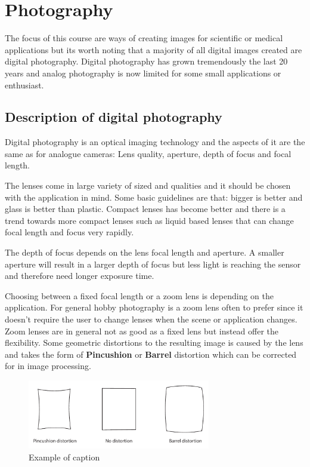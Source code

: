 \section{Photography}
The focus of this course are ways of creating images for scientific or medical applications but its worth noting that a majority of all digital images created are digital photography. Digital photography has grown tremendously the last 20 years and analog photography is now limited for some small applications or enthusiast. 

\subsection{Description of digital photography}
Digital photography is an optical imaging technology and the aspects of it are the same as for analogue cameras: Lens quality, aperture, depth of focus and focal length. 

The lenses come in large variety of sized and qualities and it should be chosen with the application in mind. Some basic guidelines are that: bigger is better and glass is better than plastic. Compact lenses has become better and there is a trend towards more compact lenses such as liquid based lenses that can change focal length and focus very rapidly. 

The depth of focus depends on the lens focal length and aperture. A smaller aperture will result in a larger depth of focus but less light is reaching the sensor and therefore need longer exposure time. 

Choosing between a fixed focal length or a zoom lens is depending on the application. For general hobby photography is a zoom lens often to prefer since it doesn't require the user to change lenses when the scene or application changes. Zoom lenses are in general not as good as a fixed lens but instead offer the flexibility. Some geometric distortions to the resulting image is caused by the lens and takes the form of \textbf{Pincushion} or \textbf{Barrel} distortion which can be corrected for in image processing. 

\begin{figure}[ht!]
\centering
\includegraphics[width=80mm]{figures/distortion.pdf}
\caption{Example of caption}
\label{fig:example}
\end{figure}



